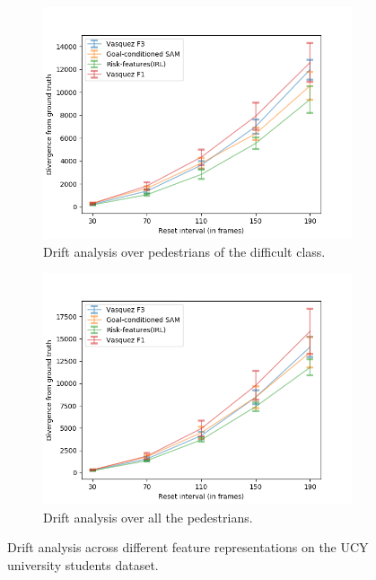 \begin{figure}[htbp]
	\begin{subfigure}{0.5\textwidth}
		\centering
		\includegraphics[width=\linewidth]{plots/ucy_inter_irl_new/drift_hard_ucy_inter_irl.png}
		\caption {Drift analysis over pedestrians of the difficult class.}
		\label{fig:inter_IRL-drift_analysis_hard}
	\end{subfigure}
	\begin{subfigure}{0.5\textwidth}
		\centering
		\includegraphics[width=\linewidth]{plots/ucy_inter_irl_new/drift_all_ucy_inter_irl.png}
		\caption {Drift analysis over all the pedestrians.}
		\label{fig:inter_IRL-drift_analysis_all}
	\end{subfigure}
	\caption{Drift analysis across different feature representations on the UCY university students dataset.}
\end{figure}

